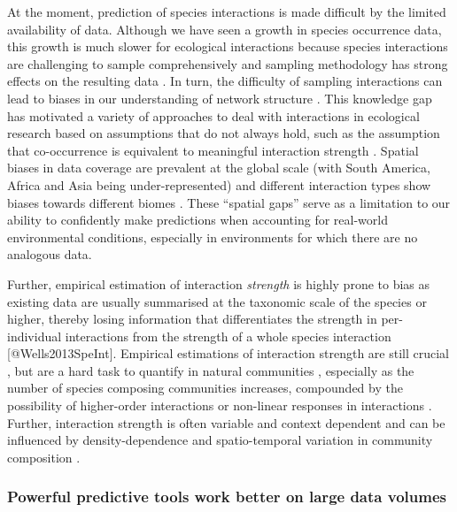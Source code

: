 At the moment, prediction of species interactions is made difficult by
the limited availability of data. Although we have seen a growth in
species occurrence data, this growth is much slower for ecological
interactions because species interactions are challenging to sample
comprehensively \cite{Bennett2019PotPit, Jordano2016SamNet} and
sampling methodology has strong effects on the resulting data
\cite{deAguiar2019RevBia}. In turn, the difficulty of sampling
interactions can lead to biases in our understanding of network
structure \cite{deAguiar2019RevBia}. This knowledge gap has motivated a
variety of approaches to deal with interactions in ecological research
based on assumptions that do not always hold, such as the assumption
that co-occurrence is equivalent to meaningful interaction strength
\cite{Blanchet2020CooNot}. Spatial biases in data coverage are prevalent
at the global scale (with South America, Africa and Asia being
under-represented) and different interaction types show biases towards
different biomes \cite{Poisot2021GloKno}. These ``spatial gaps'' serve
as a limitation to our ability to confidently make predictions when
accounting for real-world environmental conditions, especially in
environments for which there are no analogous data.

Further, empirical estimation of interaction \emph{strength} is highly
prone to bias as existing data are usually summarised at the taxonomic
scale of the species or higher, thereby losing information that
differentiates the strength in per-individual interactions from the
strength of a whole species interaction {[}@Wells2013SpeInt{]}.
Empirical estimations of interaction strength are still crucial
\cite{Novak2008EstNon}, but are a hard task to quantify in natural
communities \cite{Wootton1997EstTes, Sala2002ComDis,
Wootton2005MeaInt}, especially as the number of species composing
communities increases, compounded by the possibility of higher-order
interactions or non-linear responses in interactions
\cite{Wootton2005MeaInt}. Further, interaction strength is often
variable and context dependent and can be influenced by
density-dependence and spatio-temporal variation in community
composition \cite{Wootton2005MeaInt}.

\subsubsection{Powerful predictive tools work better on large data
volumes}\label{powerful-predictive-tools-work-better-on-large-data-volumes}

